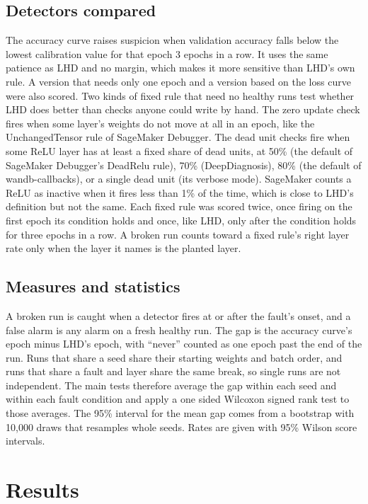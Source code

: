 \documentclass[11pt]{article}
\begin{document}
\subsection{Detectors compared}

The accuracy curve raises suspicion when validation accuracy falls below the lowest calibration value for that epoch 3 epochs in a row. It uses the same patience as LHD and no margin, which makes it more sensitive than LHD's own rule. A version that needs only one epoch and a version based on the loss curve were also scored. Two kinds of fixed rule that need no healthy runs test whether LHD does better than checks anyone could write by hand. The zero update check fires when some layer's weights do not move at all in an epoch, like the UnchangedTensor rule of SageMaker Debugger. The dead unit checks fire when some ReLU layer has at least a fixed share of dead units, at 50\% (the default of SageMaker Debugger's DeadRelu rule), 70\% (DeepDiagnosis), 80\% (the default of wandb-callbacks), or a single dead unit (its verbose mode). SageMaker counts a ReLU as inactive when it fires less than 1\% of the time, which is close to LHD's definition but not the same. Each fixed rule was scored twice, once firing on the first epoch its condition holds and once, like LHD, only after the condition holds for three epochs in a row. A broken run counts toward a fixed rule's right layer rate only when the layer it names is the planted layer.

\subsection{Measures and statistics}

A broken run is caught when a detector fires at or after the fault's onset, and a false alarm is any alarm on a fresh healthy run. The gap is the accuracy curve's epoch minus LHD's epoch, with ``never'' counted as one epoch past the end of the run. Runs that share a seed share their starting weights and batch order, and runs that share a fault and layer share the same break, so single runs are not independent. The main tests therefore average the gap within each seed and within each fault condition and apply a one sided Wilcoxon signed rank test to those averages. The 95\% interval for the mean gap comes from a bootstrap with 10,000 draws that resamples whole seeds. Rates are given with 95\% Wilson score intervals.


\section{Results}
\end{document}
